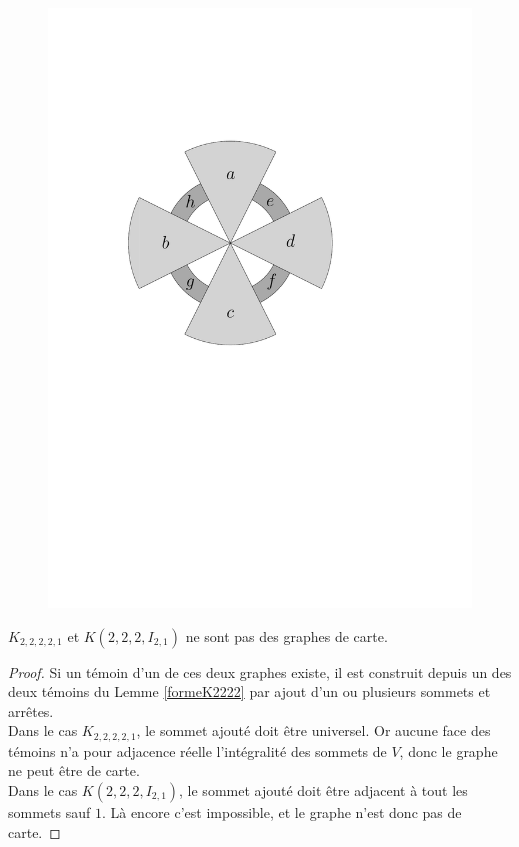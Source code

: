 \documentclass{scrartcl}
\begin{document}
\begin{flushleft}
\begin{figure}[h]
\begin{center}
        \includegraphics[page=\ipeFigsecondtemoinquatriparti, scale = 0.5]{figs}
    \end{center}
\end{figure}

\begin{prop}\label{K22221}
    $K_{2,2,2,2,1}$ et $K(2,2,2,I_{2,1})$ ne sont pas des graphes de carte.
\end{prop}

\begin{proof}
    Si un témoin d'un de ces deux graphes existe, il est construit depuis un des deux témoins du Lemme \ref{formeK2222} par ajout
    d'un ou plusieurs sommets et arrêtes.\\
    Dans le cas $K_{2,2,2,2,1}$, le sommet ajouté doit être universel. Or aucune face des témoins n'a pour adjacence réelle
    l'intégralité des sommets de $V$, donc le graphe ne peut être de carte.\\
    Dans le cas $K(2,2,2,I_{2,1})$, le sommet ajouté doit être adjacent à tout les sommets sauf $1$. Là encore c'est impossible, et le
    graphe n'est donc pas de carte.
\end{proof}



\end{flushleft}
\end{document}
